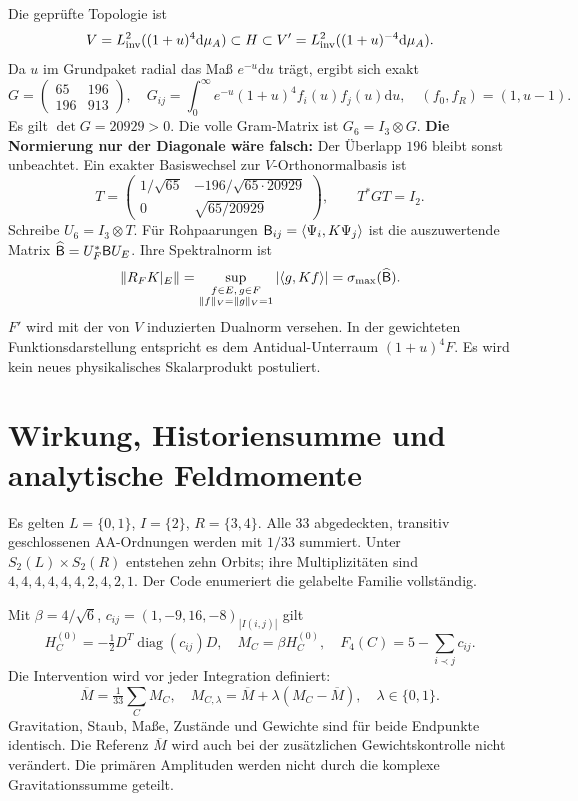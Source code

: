 \documentclass[10pt,a4paper]{article}
\newcommand{\dd}{\mathrm d}\newcommand{\one}{\mathbf1}\newcommand{\D}{\mathcal D}
\begin{document}
Die geprüfte Topologie ist
\[
 V=L^2_{\rm inv}((1+u)^4\dd\mu_A)\subset H\subset
 V'=L^2_{\rm inv}((1+u)^{-4}\dd\mu_A).
\]
Da $u$ im Grundpaket radial das Maß $e^{-u}\dd u$ trägt, ergibt sich exakt
\[
 G=\begin{pmatrix}65&196\\196&913\end{pmatrix},\quad
 G_{ij}=\int_0^\infty e^{-u}(1+u)^4 f_i(u)f_j(u)\dd u,
 \quad (f_0,f_R)=(1,u-1).
\]
Es gilt $\det G=20929>0$. Die volle Gram-Matrix ist $G_6=I_3\otimes G$.
\textbf{Die Normierung nur der Diagonale wäre falsch:} Der Überlapp $196$
bleibt sonst unbeachtet. Ein exakter Basiswechsel zur $V$-Orthonormalbasis ist
\[
 T=\begin{pmatrix}
 1/\sqrt{65}&-196/\sqrt{65\cdot20929}\\
 0&\sqrt{65/20929}
 \end{pmatrix},\qquad T^*GT=I_2.
\]
Schreibe $U_6=I_3\otimes T$. Für Rohpaarungen
$\mathsf B_{ij}=\langle\Psi_i,K\Psi_j\rangle$ ist die auszuwertende Matrix
$\widehat{\mathsf B}=U_F^*\mathsf B U_E$. Ihre Spektralnorm ist
\[
 \|R_FK|_E\|=\sup_{\substack{f\in E,\,g\in F\\\|f\|_V=\|g\|_V=1}}
 |\langle g,Kf\rangle|=\sigma_{\max}(\widehat{\mathsf B}).
\]
$F'$ wird mit der von $V$ induzierten Dualnorm versehen. In der
gewichteten Funktionsdarstellung entspricht es dem Antidual-Unterraum
$(1+u)^4F$. Es wird kein neues physikalisches Skalarprodukt postuliert.

\newpage
\section{Wirkung, Historiensumme und analytische Feldmomente}
Es gelten $L=\{0,1\}$, $I=\{2\}$, $R=\{3,4\}$. Alle 33 abgedeckten,
transitiv geschlossenen AA-Ordnungen werden mit $1/33$ summiert.
Unter $S_2(L)\times S_2(R)$ entstehen zehn Orbits; ihre Multiplizitäten sind
$4,4,4,4,4,4,2,4,2,1$. Der Code enumeriert die gelabelte Familie vollständig.

Mit $\beta=4/\sqrt6$, $c_{ij}=(1,-9,16,-8)_{|I(i,j)|}$ gilt
\[
 H_C^{(0)}=-\tfrac12D^T\operatorname{diag}(c_{ij})D,\quad
 M_C=\beta H_C^{(0)},\quad F_4(C)=5-\sum_{i\prec j}c_{ij}.
\]
Die Intervention wird vor jeder Integration definiert:
\[
 \overline M=\tfrac1{33}\sum_CM_C,\quad
 M_{C,\lambda}=\overline M+\lambda(M_C-\overline M),\quad\lambda\in\{0,1\}.
\]
Gravitation, Staub, Maße, Zustände und Gewichte sind für beide Endpunkte
identisch. Die Referenz $\overline M$ wird auch bei der zusätzlichen
Gewichtskontrolle nicht verändert. Die primären Amplituden werden nicht
durch die komplexe Gravitationssumme geteilt.
\end{document}
